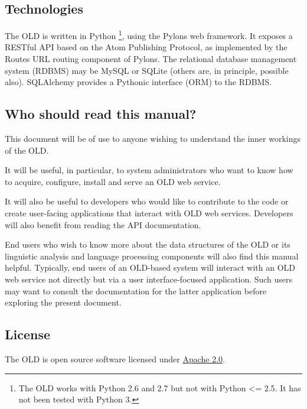 \documentclass[letterpaper,10pt,english]{sphinxmanual}
\begin{document}
\subsection{Technologies}
\label{about:technologies}
The OLD is written in Python \footnote{
The OLD works with Python 2.6 and 2.7 but not with Python \textless{}= 2.5.  It
has not been tested with Python 3.
}, using the Pylons web framework.  It exposes
a RESTful API based on the Atom Publishing Protocol, as implemented by the
Routes URL routing component of Pylons.  The relational database management
system (RDBMS) may be MySQL or SQLite (others are, in principle, possible also).
SQLAlchemy provides a Pythonic interface (ORM) to the RDBMS.


\subsection{Who should read this manual?}
\label{about:who-should-read-this-manual}
This document will be of use to anyone wishing to understand the inner workings
of the OLD.

It will be useful, in particular, to system administrators who want to know how
to acquire, configure, install and serve an OLD web service.

It will also be useful to developers who would like to contribute to the code or
create user-facing applications that interact with OLD web services.  Developers
will also benefit from reading the API documentation.

End users who wish to know more about the data structures of the OLD or its
linguistic analysis and language processing components will also find this
manual helpful.  Typically, end users
of an OLD-based system will interact with an OLD web service not directly but
via a user interface-focused application.  Such users may want to consult the
documentation for the latter application before exploring the present document.


\subsection{License}
\label{about:license}
The OLD is open source software licensed under
\href{http://www.apache.org/licenses/LICENSE-2.0.txt}{Apache 2.0}.
\end{document}
